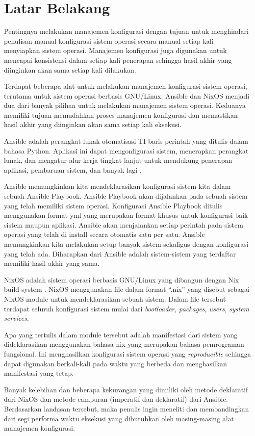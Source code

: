 \documentclass[10pt,]{report}
\begin{document}
\section{Latar Belakang}
\begin{adjustwidth}{0.70cm}{}
	\vspace{-3mm}
	\hspace\parindent
	Pentingnya melakukan manajemen konfigurasi dengan tujuan untuk menghindari
	penulisan manual konfigurasi sistem operasi secara manual setiap kali
	menyiapkan sistem operasi. Manajemen konfigurasi juga digunakan untuk
	mencapai konsistensi dalam setiap kali penerapan sehingga hasil akhir yang
	diinginkan akan sama setiap kali dilakukan.

	Terdapat beberapa alat untuk melakukan manajemen konfigurasi sistem operasi,
	terutama untuk sistem operasi berbasis GNU/Linux. Ansible dan NixOS menjadi
	dua dari banyak pilihan untuk melakukan manajemen sistem operasi. Keduanya
	memiliki tujuan memudahkan proses manajemen konfigurasi dan memastikan hasil
	akhir yang diinginkan akan sama setiap kali eksekusi.

	Ansible adalah perangkat lunak otomatisasi TI baris perintah yang ditulis
	dalam bahasa Python. Aplikasi ini dapat mengonfigurasi sistem, menerapkan
	perangkat lunak, dan mengatur alur kerja tingkat lanjut untuk mendukung
	penerapan aplikasi, pembaruan sistem, dan banyak lagi \parencite{AnsibleRedHat}.

	Ansible memungkinkan kita mendeklarasikan konfigurasi sistem kita dalam
	sebuah Ansible Playbook. Ansible Playbook akan dijalankan pada sebuah sistem
	yang telah memiliki sistem operasi. Konfigurasi Ansible Playbook ditulis
	menggunakan format yml yang merupakan format khusus untuk konfigurasi baik
	sistem maupun aplikasi. Ansible akan menjalankan setiap perintah pada sistem
	operasi yang telah di install secara otomatis satu per satu. Ansible
	memungkinkan kita melakukan setup banyak sistem sekaligus dengan konfigurasi
	yang telah ada. Diharapkan dari Ansible adalah sistem-sistem yang terdaftar
	memiliki hasil akhir yang sama.

	NixOS adalah sistem operasi berbasis GNU/Linux yang dibangun dengan Nix build
	system \parencite{hownixworks} . NixOS menggunakan file dalam format “.nix” yang disebut sebagai NixOS
	module untuk mendeklarasikan sebuah sistem. Dalam file tersebut terdapat
	seluruh konfigurasi sistem mulai dari \textit{bootloader, packages, users, system services.}

	Apa yang tertulis dalam module tersebut adalah manifestasi dari sistem yang
	dideklarasikan menggunakan bahasa nix yang merupakan bahasa pemrograman
	fungsional. Ini menghasilkan konfigurasi sistem operasi yang \textit{reproducible}
	sehingga dapat digunakan berkali-kali pada waktu yang berbeda dan
	menghasilkan manifestasi yang tetap.

	Banyak kelebihan dan beberapa kekurangan yang dimiliki oleh metode deklaratif
	dari NixOS dan metode campuran (imperatif dan deklaratif) dari Ansible.
	Berdasarkan landasan tersebut, maka penulis ingin meneliti dan membandingkan
	dari segi performa waktu eksekusi yang dibutuhkan oleh masing-masing alat manajemen
	konfigurasi.
\end{adjustwidth}
\vspace{3mm}
\end{document}
